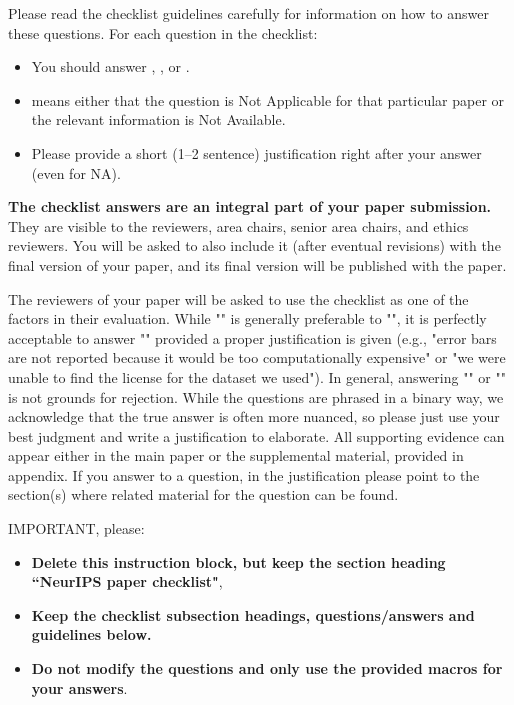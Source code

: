 \documentclass{article}
\begin{document}
Please read the checklist guidelines carefully for information on how to answer these questions. For each question in the checklist:
\begin{itemize}
    \item You should answer \answerYes{}, \answerNo{}, or \answerNA{}.
    \item \answerNA{} means either that the question is Not Applicable for that particular paper or the relevant information is Not Available.
    \item Please provide a short (1–2 sentence) justification right after your answer (even for NA). 
\end{itemize}

{\bf The checklist answers are an integral part of your paper submission.} They are visible to the reviewers, area chairs, senior area chairs, and ethics reviewers. You will be asked to also include it (after eventual revisions) with the final version of your paper, and its final version will be published with the paper.

The reviewers of your paper will be asked to use the checklist as one of the factors in their evaluation. While "\answerYes{}" is generally preferable to "\answerNo{}", it is perfectly acceptable to answer "\answerNo{}" provided a proper justification is given (e.g., "error bars are not reported because it would be too computationally expensive" or "we were unable to find the license for the dataset we used"). In general, answering "\answerNo{}" or "\answerNA{}" is not grounds for rejection. While the questions are phrased in a binary way, we acknowledge that the true answer is often more nuanced, so please just use your best judgment and write a justification to elaborate. All supporting evidence can appear either in the main paper or the supplemental material, provided in appendix. If you answer \answerYes{} to a question, in the justification please point to the section(s) where related material for the question can be found.

IMPORTANT, please:
\begin{itemize}
    \item {\bf Delete this instruction block, but keep the section heading ``NeurIPS paper checklist"},
    \item  {\bf Keep the checklist subsection headings, questions/answers and guidelines below.}
    \item {\bf Do not modify the questions and only use the provided macros for your answers}.
\end{itemize} 
 
\end{document}
